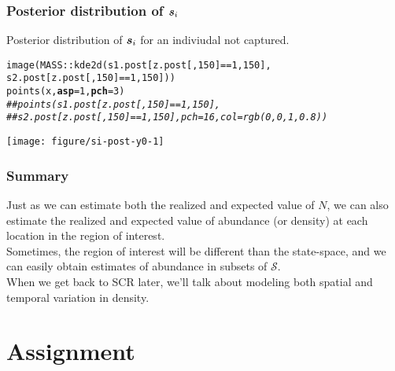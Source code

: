 \documentclass[color=usenames,dvipsnames]{beamer}\usepackage[]{graphicx}\usepackage[]{color}
\makeatletter
\newcommand{\hlnum}[1]{\textcolor[rgb]{0.69,0.494,0}{#1}}%
\newcommand{\hlcom}[1]{\textcolor[rgb]{0.514,0.506,0.514}{\textit{#1}}}%
\newcommand{\hlopt}[1]{\textcolor[rgb]{0,0,0}{#1}}%
\newcommand{\hlstd}[1]{\textcolor[rgb]{0,0,0}{#1}}%
\newcommand{\hlkwc}[1]{\textcolor[rgb]{0,0,0}{\textbf{#1}}}%
\newcommand{\hlkwd}[1]{\textcolor[rgb]{0.004,0.004,0.506}{#1}}%
\newenvironment{kframe}{%
 \def\at@end@of@kframe{}%
 \ifinner\ifhmode%
  \def\at@end@of@kframe{\end{minipage}}%
  \begin{minipage}{\columnwidth}%
 \fi\fi%
 \def\FrameCommand##1{\hskip\@totalleftmargin \hskip-\fboxsep
 \colorbox{shadecolor}{##1}\hskip-\fboxsep
     \hskip-\linewidth \hskip-\@totalleftmargin \hskip\columnwidth}%
 \MakeFramed {\advance\hsize-\width
   \@totalleftmargin\z@ \linewidth\hsize
   \@setminipage}}%
 {\par\unskip\endMakeFramed%
 \at@end@of@kframe}
\newenvironment{knitrout}{}{} %
\makeatother
\begin{document}
\begin{frame}[fragile]
  \frametitle{Posterior distribution of ${\bm s}_i$}
  \small
  Posterior distribution of ${\bm s}_i$ for an indiviudal \alert{not}
  captured. 
\begin{knitrout}\scriptsize
{}\color{fgcolor}\begin{kframe}
\begin{alltt}
\hlkwd{image}\hlstd{(MASS}\hlopt{::}\hlkwd{kde2d}\hlstd{(s1.post[z.post[,}\hlnum{150}\hlstd{]}\hlopt{==}\hlnum{1}\hlstd{,}\hlnum{150}\hlstd{],}
                  \hlstd{s2.post[z.post[,}\hlnum{150}\hlstd{]}\hlopt{==}\hlnum{1}\hlstd{,}\hlnum{150}\hlstd{]))}
\hlkwd{points}\hlstd{(x,} \hlkwc{asp}\hlstd{=}\hlnum{1}\hlstd{,} \hlkwc{pch}\hlstd{=}\hlnum{3}\hlstd{)}
\hlcom{##points(s1.post[z.post[,150]==1,150],}
\hlcom{##       s2.post[z.post[,150]==1,150], pch=16, col=rgb(0,0,1,0.8))}
\end{alltt}
\end{kframe}
\end{knitrout}
\centering
\texttt{[image: figure/si-post-y0-1]} \\
\end{frame}





\begin{frame}
  \frametitle{Summary}
  Just as we can estimate both the realized and expected value of $N$,
  we can also estimate the realized and expected value of abundance
  (or density) at each location in the region of interest. \\
  \pause \vfill
  Sometimes, the region of interest will be different than the
  state-space, and we can easily obtain estimates of abundance in
  subsets of $\mathcal{S}$. \\
  \pause \vfill
  When we get back to SCR later, we'll talk about modeling both
  spatial and temporal variation in density.
\end{frame}




\section{Assignment}
\end{document}
